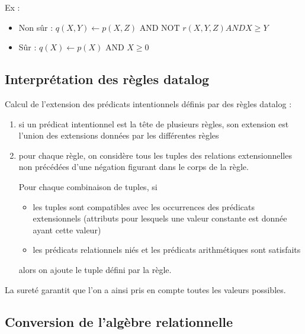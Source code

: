 		Ex :
			
		\begin{itemize}
			\item Non sûr : $q(X, Y ) \leftarrow p(X,Z) \text{ AND NOT } r(X, Y,Z) AND X \geq Y$
			\item Sûr : $q(X) \leftarrow p(X) \text{ AND } X \geq 0$
		\end{itemize}
		
		
		\pagebreak
		\subsection{Interprétation des règles datalog}
		
		Calcul de l'extension des prédicats intentionnels définis par des règles datalog :
		
		\begin{enumerate}
			\item si un prédicat intentionnel est la tête de plusieurs règles, son extension est l'union des extensions données par les différentes règles
			\item pour chaque règle, on considère tous les tuples des relations extensionnelles non précédées d'une négation figurant dans le corps de la règle.
			
			Pour chaque combinaison de tuples, si
			
			\begin{itemize}
				\item les tuples sont compatibles avec les occurrences des prédicats extensionnels (attributs pour lesquels une valeur constante est donnée ayant cette valeur)
				\item les prédicats relationnels niés et les prédicats arithmétiques sont satisfaits
			\end{itemize}
			
			alors on ajoute le tuple défini par la règle.
		\end{enumerate}
		
		La sureté garantit que l'on a ainsi pris en compte toutes les valeurs possibles.
		
		
		\subsection{Conversion de l'algèbre relationnelle}
		
